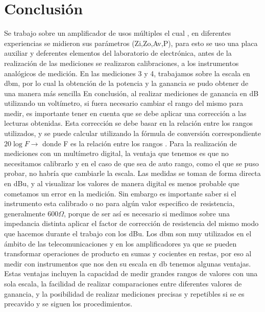 \documentclass[12pt, letterpaper]{article}
\begin{document}
\newpage
\section{Conclusión}
Se trabajo sobre un amplificador de usos múltiples el cual , en diferentes experiencias se midieron sus parámetros (Zi,Zo,Av,P), para esto se uso una placa auxiliar y deferentes elementos del laboratorio de electrónica, antes de la realización de las mediciones se realizaron  calibraciones, a los instrumentos analógicos de medición. En las mediciones 3 y 4, trabajamos sobre la escala en dbm, por lo cual la obtención de la potencia y la ganancia se pudo obtener de una manera más sencilla  
\singlespacing
En conclusión, al realizar mediciones de ganancia en dB utilizando un voltímetro, si fuera necesario cambiar el rango del mismo para medir, es importante tener en cuenta que se debe aplicar una corrección a las lecturas obtenidas. Esta corrección se debe basar en la relación entre los rangos utilizados, y se puede calcular utilizando la fórmula de conversión correspondiente $20 \log{F} \rightarrow$ donde F es la relación entre los rangos .
\singlespacing
Para la realización de mediciones con un multímetro digital, la ventaja que tenemos es que no necesitamos calibrarlo y en el caso de que sea de auto rango, como el que se puso probar,  no habría que cambiarle la escala. Las medidas se toman de forma directa en dBu, y al visualizar los valores de manera digital es menos probable que cometamos un error en la medición.  Sin embargo es importante saber si el instrumento esta calibrado o no para algún valor especifico de resistencia, generalmente 600$\Omega$, porque de ser así es necesario si medimos sobre una impedancia distinta aplicar el factor de corrección de resistencia del mismo modo que hacemos durante el trabajo con los dBu. 
\singlespacing
Los dbm son muy utilizados en el ámbito de las telecomunicaciones y en los amplificadores ya que se pueden transformar operaciones de producto en sumas y cocientes en restas, por eso  al medir con instrumentos que nos den su escala en db tenemos algunas ventajas.
\singlespacing
Estas ventajas incluyen la capacidad de medir grandes rangos de valores con una sola escala, la facilidad de realizar comparaciones entre diferentes valores de ganancia, y la posibilidad de realizar mediciones precisas y repetibles si se es precavido y se siguen los procedimientos.
\newpage
\end{document}

